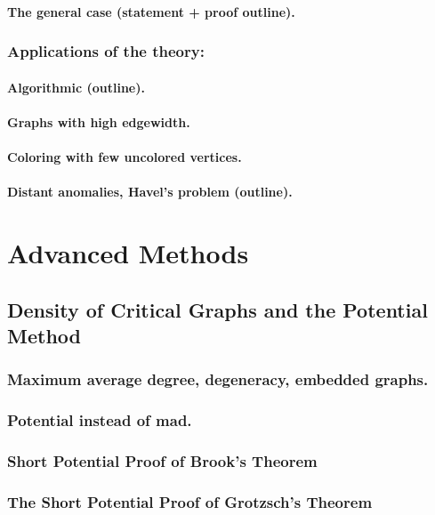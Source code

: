 \documentclass[12pt,twoside,openright,a4paper]{book}
\begin{document}
\subsection{The general case (statement + proof outline).}

\section{Applications of the theory:}
\subsection{Algorithmic (outline).}
\subsection{Graphs with high edgewidth.}
\subsection{Coloring with few uncolored vertices.}
\subsection{Distant anomalies, Havel's problem (outline).}

\part{Advanced Methods}

\chapter{Density of Critical Graphs and the Potential Method}


\section{Maximum average degree, degeneracy, embedded graphs.}
\section{Potential instead of mad.}
\section{Short Potential Proof of Brook's Theorem}
\section{The Short Potential Proof of Grotzsch's Theorem}
\end{document}
